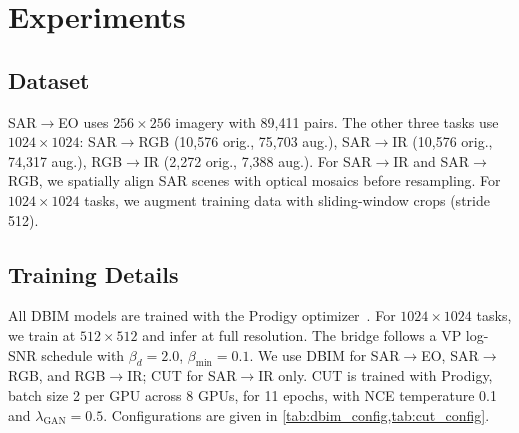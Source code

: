 \section{Experiments}
\label{sec:experiments}

\subsection{Dataset}
\label{sec:dataset}

SAR$\rightarrow$EO uses $256{\times}256$ imagery with 89,411 pairs. The other three tasks use $1024{\times}1024$: SAR$\rightarrow$RGB (10,576 orig., 75,703 aug.), SAR$\rightarrow$IR (10,576 orig., 74,317 aug.), RGB$\rightarrow$IR (2,272 orig., 7,388 aug.). For SAR$\rightarrow$IR and SAR$\rightarrow$RGB, we spatially align SAR scenes with optical mosaics before resampling. For $1024{\times}1024$ tasks, we augment training data with sliding-window crops (stride 512).

\subsection{Training Details}
\label{sec:training}

All DBIM models are trained with the Prodigy optimizer~\cite{mishchenkoProdigyExpeditiouslyAdaptive2024}. For $1024{\times}1024$ tasks, we train at $512{\times}512$ and infer at full resolution. The bridge follows a VP log-SNR schedule with $\beta_d=2.0$, $\beta_{\min}=0.1$. We use DBIM for SAR$\rightarrow$EO, SAR$\rightarrow$RGB, and RGB$\rightarrow$IR; CUT for SAR$\rightarrow$IR only. CUT is trained with Prodigy, batch size 2 per GPU across 8 GPUs, for 11 epochs, with NCE temperature 0.1 and $\lambda_{\text{GAN}}=0.5$. Configurations are given in \cref{tab:dbim_config,tab:cut_config}.


